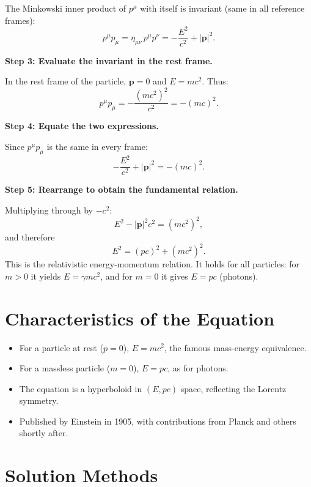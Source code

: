 The Minkowski inner product of $p^\mu$ with itself is invariant (same in all reference frames):
\begin{equation}
p^\mu p_\mu = \eta_{\mu\nu}\,p^\mu p^\nu = -\frac{E^2}{c^2} + |\mathbf{p}|^2.
\end{equation}

\textbf{Step 3: Evaluate the invariant in the rest frame.}

In the rest frame of the particle, $\mathbf{p} = 0$ and $E = mc^2$. Thus:
\begin{equation}
p^\mu p_\mu = -\frac{(mc^2)^2}{c^2} = -(mc)^2.
\end{equation}

\textbf{Step 4: Equate the two expressions.}

Since $p^\mu p_\mu$ is the same in every frame:
\begin{equation}
-\frac{E^2}{c^2} + |\mathbf{p}|^2 = -(mc)^2.
\end{equation}

\textbf{Step 5: Rearrange to obtain the fundamental relation.}

Multiplying through by $-c^2$:
\begin{equation}
E^2 - |\mathbf{p}|^2c^2 = (mc^2)^2,
\end{equation}
and therefore
\begin{equation}
\boxed{E^2 = (pc)^2 + (mc^2)^2.}
\end{equation}
This is the relativistic energy-momentum relation. It holds for all particles: for $m > 0$ it yields $E = \gamma mc^2$, and for $m = 0$ it gives $E = pc$ (photons).

\section*{Characteristics of the Equation}

\begin{itemize}
    \item For a particle at rest ($p = 0$), $E = mc^2$, the famous mass-energy equivalence.
    \item For a massless particle ($m = 0$), $E = pc$, as for photons.
    \item The equation is a hyperboloid in $(E, pc)$ space, reflecting the Lorentz symmetry.
    \item Published by Einstein in 1905, with contributions from Planck and others shortly after.
\end{itemize}
\section*{Solution Methods}

